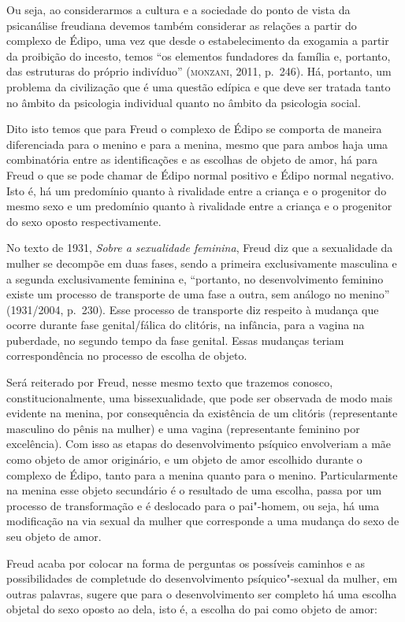 Ou seja, ao considerarmos a cultura e a sociedade do ponto de vista da
psicanálise freudiana devemos também considerar as relações a partir do
complexo de Édipo, uma vez que desde o estabelecimento da exogamia a
partir da proibição do incesto, temos ``os elementos fundadores da
família e, portanto, das estruturas do próprio indivíduo'' (\textsc{monzani},
2011, p.~246). Há, portanto, um problema da civilização que é uma questão
edípica e que deve ser tratada tanto no âmbito da psicologia individual
quanto no âmbito da psicologia social.

Dito isto temos que para Freud o complexo de Édipo se comporta de
maneira diferenciada para o menino e para a menina, mesmo que para ambos
haja uma combinatória entre as identificações e as escolhas de objeto de
amor, há para Freud o que se pode chamar de Édipo normal positivo e
Édipo normal negativo. Isto é, há um predomínio quanto à rivalidade
entre a criança e o progenitor do mesmo sexo e um predomínio quanto à
rivalidade entre a criança e o progenitor do sexo oposto
respectivamente.

No texto de 1931, \emph{Sobre a sexualidade feminina}, Freud diz que a
sexualidade da mulher se decompõe em duas fases, sendo a primeira
exclusivamente masculina e a segunda exclusivamente feminina e,
``portanto, no desenvolvimento feminino existe um processo de transporte
de uma fase a outra, sem análogo no menino'' (1931/2004, p.~230).
Esse processo de transporte diz respeito à mudança que ocorre durante
fase genital/fálica do clitóris, na infância, para a vagina na puberdade,
no segundo tempo da fase genital. Essas mudanças teriam correspondência
no processo de escolha de objeto.

Será reiterado por Freud, nesse mesmo texto que trazemos conosco,
constitucionalmente, uma bissexualidade, que pode ser observada de modo
mais evidente na menina, por consequência da existência de um clitóris
(representante masculino do pênis na mulher) e uma vagina (representante
feminino por excelência). Com isso as etapas do desenvolvimento psíquico
envolveriam a mãe como objeto de amor originário, e um objeto de amor
escolhido durante o complexo de Édipo, tanto para a menina quanto para o
menino. Particularmente na menina esse objeto secundário é o resultado
de uma escolha, passa por um processo de transformação e é deslocado
para o pai"-homem, ou seja, há uma modificação na via sexual da mulher
que corresponde a uma mudança do sexo de seu objeto de amor.

Freud acaba por colocar na forma de perguntas os possíveis caminhos e as
possibilidades de completude do desenvolvimento psíquico"-sexual da
mulher, em outras palavras, sugere que para o desenvolvimento ser
completo há uma escolha objetal do sexo oposto ao dela, isto é, a
escolha do pai como objeto de amor:

